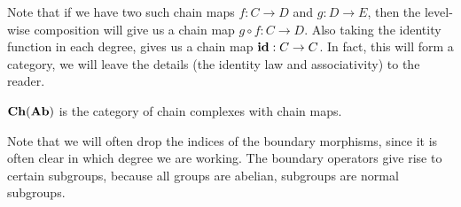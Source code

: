 Note that if we have two such chain maps $f:C \to D$ and $g:D \to E$, then the level-wise composition will give us a chain map $g \circ f: C \to D$. Also taking the identity function in each degree, gives us a chain map $\mathbf{id} : C \to C$. In fact, this will form a category, we will leave the details (the identity law and associativity) to the reader.

\begin{definition}
	$\mathbf{Ch}(\mathbf{Ab})$ is the category of chain complexes with chain maps.
\end{definition}

Note that we will often drop the indices of the boundary morphisms, since it is often clear in which degree we are working. The boundary operators give rise to certain subgroups, because all groups are abelian, subgroups are normal subgroups.

